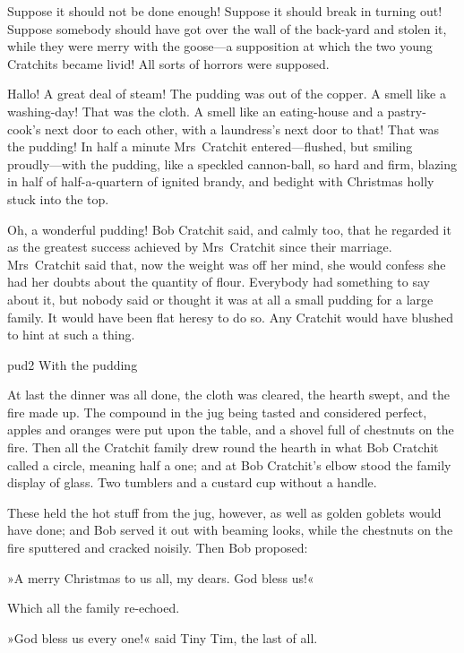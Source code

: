 Suppose it should not be done enough! Suppose it should break in turning out! Suppose somebody should have got over the wall of the back-yard and stolen it, while they were merry with the goose---a supposition at which the two young Cratchits became livid! All sorts of horrors were supposed.

Hallo! A great deal of steam! The pudding was out of the copper. A smell like a washing-day! That was the cloth. A smell like an eating-house and a pastry-cook's next door to each other, with a laundress's next door to that! That was the pudding! In half a minute Mrs~Cratchit entered---flushed, but smiling proudly---with the pudding, like a speckled cannon-ball, so hard and firm, blazing in half of half-a-quartern of ignited brandy, and bedight with Christmas holly stuck into the top.

Oh, a wonderful pudding! Bob Cratchit said, and calmly too, that he regarded it as the greatest success achieved by Mrs~Cratchit since their marriage. Mrs~Cratchit said that, now the weight was off her mind, she would confess she had her doubts about the quantity of flour. Everybody had something to say about it, but nobody said or thought it was at all a small pudding for a large family. It would have been flat heresy to do so. Any Cratchit would have blushed to hint at such a thing.

\begin{bwbigpic}
	[\bigpicsize]
	{pud2}
	{With the pudding}
\end{bwbigpic}


At last the dinner was all done, the cloth was cleared, the hearth swept, and the fire made up. The compound in the jug being tasted and considered perfect, apples and oranges were put upon the table, and a shovel full of chestnuts on the fire. Then all the Cratchit family drew round the hearth in what Bob Cratchit called a circle, meaning half a one; and at Bob Cratchit's elbow stood the family display of glass. Two tumblers and a custard cup without a handle.

These held the hot stuff from the jug, however, as well as golden goblets would have done; and Bob served it out with beaming looks, while the chestnuts on the fire sputtered and cracked noisily. Then Bob proposed:

»A merry Christmas to us all, my dears. God bless us!«

Which all the family re-echoed.

»God bless us every one!« said Tiny Tim, the last of all.

